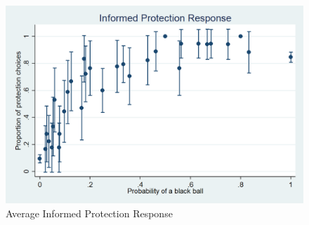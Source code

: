 \documentclass[11pt,a4paper]{article}
\begin{document}
\begin{figure}[H]
\centering
\caption{Average Informed Protection Response} \label{Informed Protection Responses}

  \centering
  \includegraphics[scale=0.3]{Graphs/ip_response.png}

\end{figure}
\end{document}
